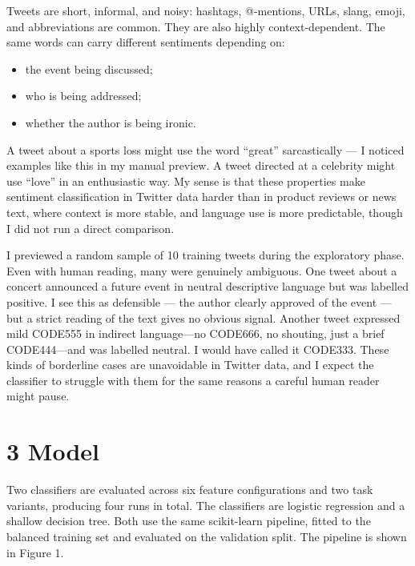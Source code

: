 \documentclass[12pt]{article}
\begin{document}
Tweets are short, informal, and noisy: hashtags, @-mentions, URLs, slang, emoji, and abbreviations are common. They are also highly context-dependent. The same words can carry different sentiments depending on:

\begin{itemize}

  \item the event being discussed;

  \item who is being addressed;

  \item whether the author is being ironic.

\end{itemize} A tweet about a sports loss might use the word ``great'' sarcastically --- I noticed examples like this in my manual preview. A tweet directed at a celebrity might use ``love'' in an enthusiastic way. My sense is that these properties make sentiment classification in Twitter data harder than in product reviews or news text, where context is more stable, and language use is more predictable, though I did not run a direct comparison.



I previewed a random sample of 10 training tweets during the exploratory phase. Even with human reading, many were genuinely ambiguous. One tweet about a concert announced a future event in neutral descriptive language but was labelled positive. I see this as defensible --- the author clearly approved of the event --- but a strict reading of the text gives no obvious signal. Another tweet expressed mild CODE555 in indirect language—no CODE666, no shouting, just a brief CODE444—and was labelled neutral. I would have called it CODE333. These kinds of borderline cases are unavoidable in Twitter data, and I expect the classifier to struggle with them for the same reasons a careful human reader might pause.



\section*{3 Model}



Two classifiers are evaluated across six feature configurations and two task variants, producing four runs in total. The classifiers are logistic regression and a shallow decision tree. Both use the same scikit-learn pipeline, fitted to the balanced training set and evaluated on the validation split. The pipeline is shown in Figure 1.
\end{document}
